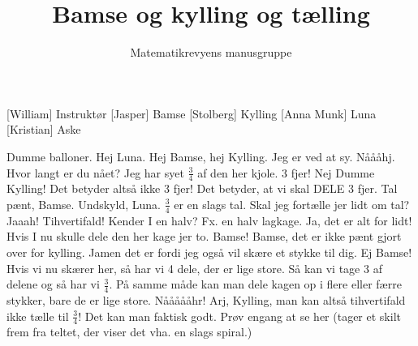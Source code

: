\documentclass[a4paper,11pt]{article}
\title{Bamse og kylling og tælling}
\author{Matematikrevyens manusgruppe}
\begin{document}
\maketitle

\begin{roles}
[William] Instruktør
[Jasper] Bamse
[Stolberg] Kylling
[Anna Munk] Luna
[Kristian] Aske
\end{roles}


  
\begin{sketch}
 Dumme balloner.
 Hej Luna.
 Hej Bamse, hej Kylling. Jeg er ved at sy.
 Nåååhj. Hvor langt er du nået?
 Jeg har syet $\frac{3}{4}$ af den her kjole.
 3 fjer!
 Nej Dumme Kylling! Det betyder altså ikke 3 fjer! Det betyder, at vi skal DELE 3 fjer.
 Tal pænt, Bamse.
 Undskyld, Luna.
 $\frac{3}{4}$ er en slags tal. Skal jeg fortælle jer lidt om tal?
 Jaaah!
 Tihvertifald!
 Kender I en halv? Fx. en halv lagkage.
 Ja, det er alt for lidt!
 Hvis I nu skulle dele den her kage jer to.
 Bamse!
 Bamse, det er ikke pænt gjort over for kylling.
 Jamen det er fordi jeg også vil skære et stykke til dig.
 Ej Bamse! Hvis vi nu skærer her, så har vi 4 dele, der er lige store. Så kan vi tage 3 af delene og så har vi $\frac{3}{4}$. På samme måde kan man dele kagen op i flere eller færre stykker, bare de er lige store.
 Nåååååhr!
 Arj, Kylling, man kan altså tihvertifald ikke tælle til $\frac{3}{4}$!
 Det kan man faktisk godt. Prøv engang at se her (tager et skilt frem fra teltet, der viser det vha. en slags spiral.)

\end{sketch}
\end{document}
